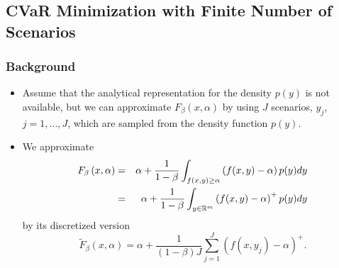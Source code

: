 \documentclass[pdf,10pt,xcolor=dvipsnames,hide notes]{beamer}
\begin{document}
\subsection{CVaR Minimization with Finite Number of Scenarios}
\begin{frame}[label=frame2b7]
	\frametitle{Background}
	\setlength{\parskip}{15pt}
	
		\begin{itemize}
		\setlength{\parskip}{15pt}
		\justifying
		
		\item Assume that the analytical representation for the density $p(y)$ is not
		available, but we can approximate $F_{\beta }\left( x,\alpha \right) $ by using
		$J$ scenarios, $y_{j}$, $j=1,\ldots,J$, which are sampled from the density
		function $p(y)$. 
		
		\item We approximate
		\begin{eqnarray}
		F_{\beta }\left( x,\alpha \right) &=&\alpha +\frac{1}{1-\beta }%
		\int_{f(x,y)\geq \alpha }\left( f(x,y)-\alpha \right) p(y)dy  \notag \\
		&=&\alpha +\frac{1}{1-\beta }\int_{y\in
			\mathbb{R}
			^{m}}\left( f(x,y)-\alpha \right) ^{+}p(y)dy  \label{fb}
		\end{eqnarray}%
		by its discretized version
		\begin{equation*}
		\widetilde{F}_{\beta }\left( x,\alpha \right) =\alpha +\frac{1}{\left(
			1-\beta \right) J}\sum_{j=1}^{J}\left( f(x,y_{j})-\alpha \right) ^{+}.
		\end{equation*}%
				
	\end{itemize}
	
\end{frame}
\end{document}
